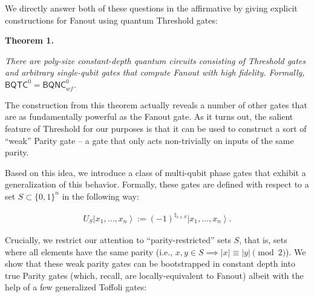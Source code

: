 We directly answer both of these questions in the affirmative by giving explicit constructions for Fanout using quantum Threshold gates:\par





\par\medskip\noindent\textbf{
\textbf{Theorem 1}\textbf{.}
}\par



\emph{There are poly-size constant-depth quantum circuits consisting of Threshold gates and arbitrary single-qubit gates that compute Fanout with high fidelity. Formally, ${\mathsf{BQTC}}^{0}={\mathsf{BQNC}}^{0}_{wf}$.}\par






The construction from this theorem actually reveals a number of other gates that are as fundamentally powerful as the Fanout gate. As it turns out, the salient feature of Threshold for our purposes is that it can be used to construct a sort of “weak” Parity gate – a gate that only acts non-trivially on inputs of the same parity.\par




Based on this idea, we introduce a class of multi-qubit phase gates that exhibit a generalization of this behavior. Formally, these gates are defined with respect to a set $S\subset\{0,1\}^{n}$ in the following way:\par


\[\begin{gathered}
U_{S}\left|x_{1},\ldots,x_{n}\right\rangle:=(-1)^{\mathbb{I}_{x\in S}}\left|x_{1},\ldots,x_{n}\right\rangle.
\end{gathered}\]


Crucially, we restrict our attention to “parity-restricted” sets $S$, that is, sets where all elements have the same parity (i.e., $x,y\in S\implies|x|\equiv|y|\pmod{2}$). We show that these weak parity gates can be bootstrapped in constant depth into true Parity gates (which, recall, are locally-equivalent to Fanout) albeit with the help of a few generalized Toffoli gates:\par





